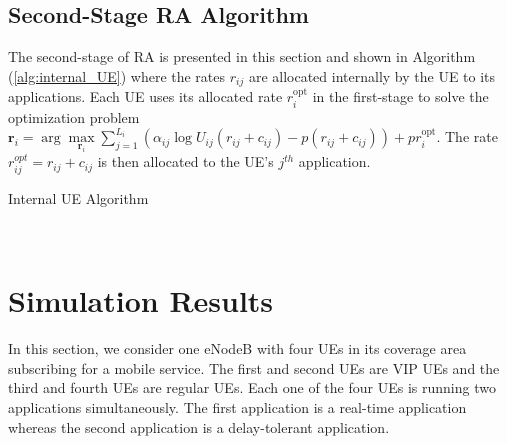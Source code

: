 \documentclass[journal]{IEEEtran} 				\IEEEoverridecommandlockouts 						\usepackage{amsmath,amssymb}
\begin{document}
\subsection{Second-Stage RA Algorithm}\label{sec:app_alloc_alg}
The second-stage of RA is presented in this section and shown in Algorithm (\ref{alg:internal_UE}) where the rates $r_{ij}$ are allocated internally by the UE to its applications. Each UE uses its allocated rate $r_i^{\text{opt}}$ in the first-stage to solve the optimization problem $\textbf{r}_i =  \arg \underset{\textbf{r}_i}\max \sum_{j=1}^{L_i}(\alpha_{ij}\log U_{ij}(r_{ij}+c_{ij})- p (r_{ij}+c_{ij})) +p r_i^{\text{opt}}$. The rate $r_{ij}^{opt}=r_{ij}+c_{ij}$ is then allocated to the UE's $j^{th}$ application.
\begin{algorithm}\caption{Internal UE Algorithm}\label{alg:internal_UE}
\begin{algorithmic}
\LOOP
{}
\\
\ENDLOOP
\end{algorithmic}
\end{algorithm}
\section{Simulation Results}\label{sec:sim}
In this section, we consider one eNodeB with four UEs in its coverage area subscribing for a mobile service. The first and second UEs are VIP UEs and the third and fourth UEs are regular UEs. Each one of the four UEs is running two applications simultaneously. The first application is a real-time application whereas the second application is a delay-tolerant application.
\end{document}
